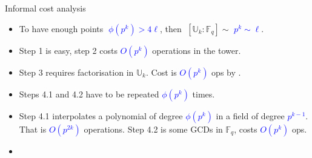 \documentclass[10pt]{beamer}
\newcommand{\blue}[1]{\textcolor{blue}{#1}}  %
\newcommand{\U}{\mathbb{U}}  %
\newcommand{\F}{\mathbb{F}}  %
\newcommand{\euler}{\phi}  %
\newcommand{\0}{\mathcal{O}}  %
\begin{document}
\begin{frame}
  \begin{block}{\alert<2>{Informal} cost analysis}
    \begin{itemize}
    \item To have enough points \blue{$\;\euler(p^k) > 4\ell$}, then
      $\;[\U_k:\F_q] \sim$ \blue{$p^k \sim \ell$}.
    \item Step 1 is easy, step 2 costs \blue{$O(p^k)$}
      \alert<2>{operations in the tower}.
    \item \alert<1>{Step 3 requires factorisation in $\U_k$. Cost is
      \blue{$O(p^{k})$} \alert<2>{ops} by \cite{Couveignes00}.}
    \item Steps 4.1 and 4.2 have to be repeated
      \blue{$\euler(p^k)$} times.
    \item Step 4.1 interpolates a polynomial of degree
      \blue{$\euler(p^k)$} in a field of degree \blue{$p^{k-1}$}. That
      is \blue{$O(p^{2k})$} \alert<2>{operations}. Step 4.2 is some GCDs
      in $\F_q$, costs \blue{$O(p^k)$} \alert<2>{ops}.
    \item {}
    \end{itemize}
  \end{block}
\end{frame}

\end{document}
